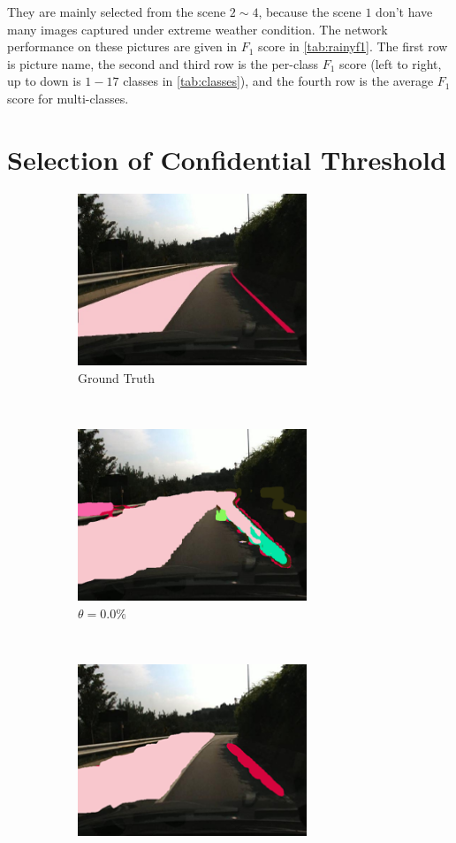 \begin{spacing}{1.5}
They are mainly selected from the scene $2 \sim 4$, because the scene $1$ don't have many images captured under extreme weather condition. The network performance on these pictures are given in $F_1$ score in \autoref{tab:rainyf1}. The first row is picture name, the second and third row is the per-class $F_1$ score (left to right, up to down is $1-17$ classes in \autoref{tab:classes}), and the fourth row is the average $F_1$ score for multi-classes.


\section{Selection of Confidential Threshold}
\label{sec:EX_threshold}

\begin{figure}[!ht]
    \centering
    \begin{subfigure}[b]{0.49\textwidth}
        \centering
        \includegraphics[width=2.7in, fbox]{Chapter5/Picture3an.jpg}
        \caption{Ground Truth}
    \end{subfigure}%
    ~
    \begin{subfigure}[b]{0.49\textwidth}
        \centering
        \includegraphics[width=2.7in, fbox]{Chapter5/pic1conf0.png}
        \caption{$\theta = 0.0\%$}
    \end{subfigure}
    \\
    \begin{subfigure}[b]{0.49\textwidth}
        \centering
        \includegraphics[width=2.7in, fbox]{Chapter5/pic1conf31.png}

\end{subfigure}
\end{figure}
\end{spacing}

